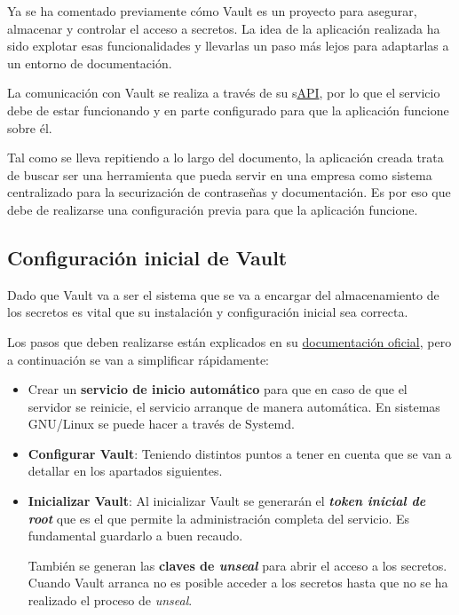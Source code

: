 \documentclass{\ClassPath/viu-tfm-template}
\begin{document}
Ya se ha comentado previamente cómo Vault es un proyecto para asegurar, almacenar y controlar el acceso a secretos. La idea de la aplicación realizada ha sido explotar esas funcionalidades y llevarlas un paso más lejos para adaptarlas a un entorno de documentación.

La comunicación con Vault se realiza a través de su s\href{https://developer.hashicorp.com/vault/api-docs}{API}, por lo que el servicio debe de estar funcionando y en parte configurado para que la aplicación funcione sobre él.

Tal como se lleva repitiendo a lo largo del documento, la aplicación creada trata de buscar ser una herramienta que pueda servir en una empresa como sistema centralizado para la securización de contraseñas y documentación. Es por eso que debe de realizarse una configuración previa para que la aplicación funcione.

\subsection{Configuración inicial de Vault}

Dado que Vault va a ser el sistema que se va a encargar del almacenamiento de los secretos es vital que su instalación y configuración inicial sea correcta.

Los pasos que deben realizarse están explicados en su \href{https://developer.hashicorp.com/vault/tutorials/getting-started/getting-started-deploy}{documentación oficial}, pero a continuación se van a simplificar rápidamente:

\begin{itemize}
    \item Crear un \textbf{servicio de inicio automático} para que en caso de que el servidor se reinicie, el servicio arranque de manera automática. En sistemas GNU/Linux se puede hacer a través de Systemd.
    \item \textbf{Configurar Vault}: Teniendo distintos puntos a tener en cuenta que se van a detallar en los apartados siguientes.
    \item \textbf{Inicializar Vault}: Al inicializar Vault se generarán el \textit{\textbf{token inicial de root}} que es el que permite la administración completa del servicio. Es fundamental guardarlo a buen recaudo.

    También se generan las \textbf{claves de \textit{unseal}} para abrir el acceso a los secretos. Cuando Vault arranca no es posible acceder a los secretos hasta que no se ha realizado el proceso de \textit{unseal}.
\end{itemize}
\end{document}
